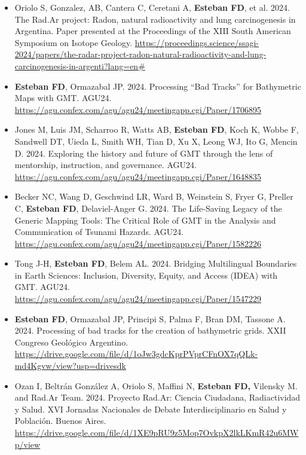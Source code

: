 \documentclass[11pt, a4paper]{article}
\begin{document}
\begin{itemize}
  \item Oriolo S, Gonzalez, AB, Cantera C, Ceretani A, \textbf{Esteban FD}, et al. 2024. The Rad.Ar project: Radon, natural radioactivity and lung carcinogenesis in Argentina. Paper presented at the Proceedings of the XIII South American Symposium on Isotope Geology. \url{https://proceedings.science/ssagi-2024/papers/the-radar-project-radon-natural-radioactivity-and-lung-carcinogenesis-in-argenti?lang=en#}

  \item \textbf{Esteban FD}, Ormazabal JP. 2024. Processing “Bad Tracks” for Bathymetric Maps with GMT. AGU24. \url{https://agu.confex.com/agu/agu24/meetingapp.cgi/Paper/1706895}

  \item Jones M, Luis JM, Scharroo R, Watts AB, \textbf{Esteban FD}, Koch K, Wobbe F, Sandwell DT, Uieda L, Smith WH, Tian D, Xu X, Leong WJ, Ito G, Mencin D. 2024. Exploring the history and future of GMT through the lens of mentorship, instruction, and governance. AGU24. \url{https://agu.confex.com/agu/agu24/meetingapp.cgi/Paper/1648835}

  \item Becker NC, Wang D, Geschwind LR, Ward B, Weinstein S, Fryer G, Preller C, \textbf{Esteban FD}, Delaviel-Anger G. 2024. The Life-Saving Legacy of the Generic Mapping Tools: The Critical Role of GMT in the Analysis and Communication of Tsunami Hazards. AGU24. \url{https://agu.confex.com/agu/agu24/meetingapp.cgi/Paper/1582226}

  \item Tong J-H, \textbf{Esteban FD}, Belem AL. 2024. Bridging Multilingual Boundaries in Earth Sciences: Inclusion, Diversity, Equity, and Access (IDEA) with GMT. AGU24. \url{https://agu.confex.com/agu/agu24/meetingapp.cgi/Paper/1547229}

  \item \textbf{Esteban FD}, Ormazabal JP, Principi S, Palma F, Bran DM, Tassone A. 2024. Processing of bad tracks for the creation of bathymetric grids. XXII Congreso Geológico Argentino. \url{https://drive.google.com/file/d/1oJw3gdcKprPVprCFnOX7qQLk-md4Kgvw/view?usp=drivesdk}

  \item Ozan I, Beltrán González A, Oriolo S, Maffini N, \textbf{Esteban FD,} Vilensky M. and Rad.Ar Team. 2024. Proyecto Rad.Ar: Ciencia Ciudadana, Radiactividad y Salud. XVI Jornadas Nacionales de Debate Interdisciplinario en Salud y Población. Buenos Aires. \url{https://drive.google.com/file/d/1XE9pRU9z5Mop7OvkpX2lkLKmR42u6MWp/view}


\end{itemize}
\end{document}
